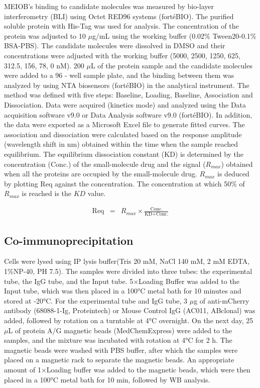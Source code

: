 \documentclass[unnumsec,webpdf,contemporary,large]{oup-authoring-template}%
\theoremstyle{thmstyleone}%
\theoremstyle{thmstyletwo}%
\theoremstyle{thmstylethree}%
\begin{document}
MEIOB's binding to candidate molecules was measured by bio-layer interferometry (BLI) using Octet RED96 systems (fortéBIO). The purified soluble protein with His-Tag was used for analysis. The concentration of the protein was adjusted to 10 $\mu$g/mL using the working buffer (0.02\% Tween20-0.1\% BSA-PBS). The candidate molecules were dissolved in DMSO and their concentrations were adjusted with the working buffer (5000, 2500, 1250, 625, 312.5, 156, 78, 0 nM). 200 $\mu$L of the protein sample and the candidate molecules were added to a 96 - well sample plate, and the binding between them was analyzed by using NTA biosensors (fortéBIO) in the analytical instrument. The method was defined with five steps: Baseline, Loading, Baseline, Association and Dissociation. Data were acquired (kinetics mode) and analyzed using the Data acquisition software v9.0 or Data Analysis software v9.0 (fortéBIO). In addition, the data were exported as a Microsoft Excel file to generate fitted curves. The association and dissociation were calculated based on the response amplitude (wavelength shift in nm) obtained within the time when the sample reached equilibrium. The equilibrium dissociation constant ($\text{KD}$) is determined by the concentration ($\text{Conc.}$) of the small-molecule drug and the signal ($R_{max}$) obtained when all the proteins are occupied by the small-molecule drug. $R_{max}$ is deduced by plotting $\text{Req}$ against the concentration. The concentration at which 50\% of $R_{max}$ is reached is the $KD$ value.

\begin{eqnarray}
\text{Req} & = & R_{max} \times  \frac{\text{Conc.}}{\text{KD} + \text{Conc.}} 
\end{eqnarray}


\subsection*{Co-immunoprecipitation}
Cells were lysed using IP lysis buffer(Tris 20 mM, NaCl 140 mM, 2 mM EDTA, 1\%NP-40, PH 7.5). The samples were divided into three tubes: the experimental tube, the IgG tube, and the Input tube. 5×Loading Buffer was added to the Input tube, which was then placed in a 100°C metal bath for 10 minutes and stored at -20°C. For the experimental tube and IgG tube, 3 $\mu$g of anti-mCherry antibody (68088-1-Ig, Proteintech) or Mouse Control IgG (AC011, ABclonal) was added, followed by rotation on a turntable at 4°C overnight. On the next day, 25 $\mu$L of protein A/G magnetic beads (MedChemExpress) were added to the samples, and the mixture was incubated with rotation at 4°C for 2 h. The magnetic beads were washed with PBS buffer, after which the samples were placed on a magnetic rack to separate the magnetic beads. An appropriate amount of 1×Loading buffer was added to the magnetic beads, which were then placed in a 100°C metal bath for 10 min, followed by WB analysis.
\end{document}

